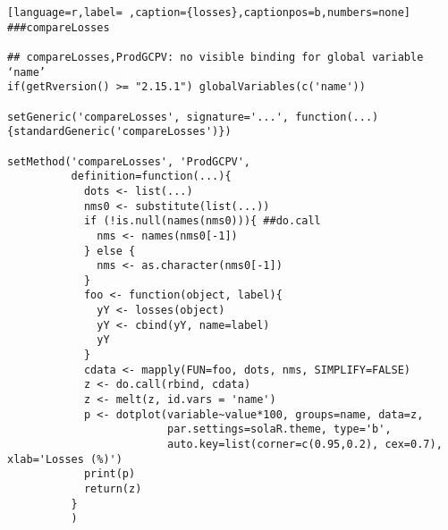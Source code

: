 \begin{lstlisting}[language=r,label= ,caption={losses},captionpos=b,numbers=none]
###compareLosses

## compareLosses,ProdGCPV: no visible binding for global variable ‘name’
if(getRversion() >= "2.15.1") globalVariables(c('name'))

setGeneric('compareLosses', signature='...', function(...){standardGeneric('compareLosses')})

setMethod('compareLosses', 'ProdGCPV',
          definition=function(...){
            dots <- list(...)
            nms0 <- substitute(list(...))
            if (!is.null(names(nms0))){ ##do.call
              nms <- names(nms0[-1])
            } else {
              nms <- as.character(nms0[-1])
            }
            foo <- function(object, label){
              yY <- losses(object)
              yY <- cbind(yY, name=label)
              yY
            }
            cdata <- mapply(FUN=foo, dots, nms, SIMPLIFY=FALSE)
            z <- do.call(rbind, cdata)
            z <- melt(z, id.vars = 'name')
            p <- dotplot(variable~value*100, groups=name, data=z,
                         par.settings=solaR.theme, type='b',
                         auto.key=list(corner=c(0.95,0.2), cex=0.7), xlab='Losses (%)')
            print(p)
            return(z)
          }
          )
\end{lstlisting}
